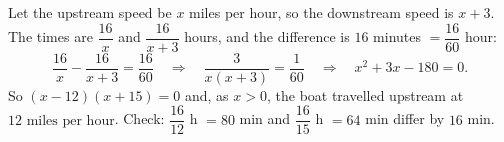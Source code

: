 Let the upstream speed be $x$ miles per hour, so the downstream speed is $x+3$. The times are $\dfrac{16}{x}$ and $\dfrac{16}{x+3}$ hours, and the difference is $16$ minutes $=\dfrac{16}{60}$ hour:
\[
\dfrac{16}{x}-\dfrac{16}{x+3}=\dfrac{16}{60}\quad\Longrightarrow\quad\dfrac{3}{x(x+3)}=\dfrac{1}{60}\quad\Longrightarrow\quad x^2+3x-180=0 .
\]
So $(x-12)(x+15)=0$ and, as $x>0$, the boat travelled upstream at $\boxed{12\text{ miles per hour}}$. Check: $\dfrac{16}{12}$ h $=80$ min and $\dfrac{16}{15}$ h $=64$ min differ by $16$ min.
